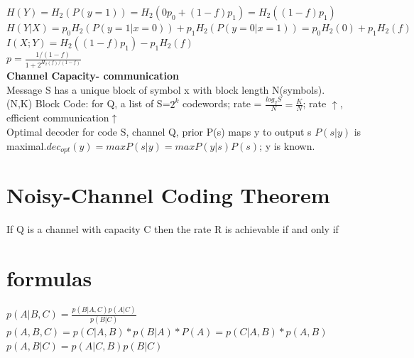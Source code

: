 \documentclass[12pt,a4paper]{extarticle}
\begin{document}
$H(Y)=H_2(P(y=1))=H_2(0p_0+(1-f)p_1)=H_2((1-f)p_1)$\\
$H(Y|X)=p_0H_2(P(y=1|x=0))+p_1H_2(P(y=0|x=1))=p_0H_2(0)+p_1H_2(f)$\\
$I(X;Y)=H_2((1-f)p_1)-p_1H_2(f)$\\
$p=\frac{1/(1-f)}{1+2^{H_2(f)/(1-f)}}$\\
\newline
\textbf{Channel Capacity- communication}\\
Message S has a unique block of symbol x with block length N(symbols).\\
(N,K) Block Code: for Q, a list of S=$2^k$ codewords; rate = $\frac{log_2S}{N}=\frac{K}{N}$; rate $\uparrow$, efficient communication$\uparrow$\\
Optimal decoder for code S, channel Q, prior P(s) maps y to output s $P(s|y)$ is maximal.$dec_{opt}(y)= maxP(s|y)=maxP(y|s)P(s)$; y is known.\\

\section{Noisy-Channel Coding Theorem}
If Q is a channel with capacity C then the rate R is achievable if and only if  \\

\section{formulas}
$p(A|B,C)=\frac{p(B|A,C)p(A|C)}{p(B|C)}$\\
$p(A,B,C)=p(C|A,B)*p(B|A)*P(A)=p(C|A,B)*p(A,B)$\\
$p(A,B|C)=p(A|C,B)p(B|C)$\\
\end{document}
